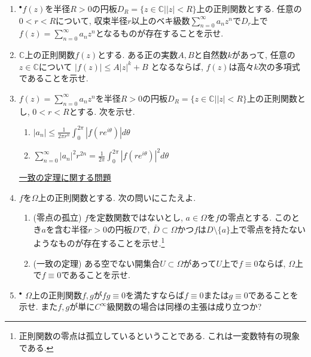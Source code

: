 \documentclass[dvipdfmx,a4paper,11pt]{article}
\newcommand{\N}{\mathbb{N}}
\newcommand{\C}{\mathbb{C}}
\theoremstyle{definition}
\begin{document}
\begin{enumerate}[label=\textbf{問}3.\arabic*]
\item $^{\bullet}$$f(z) $を半径$R>0$の円板$D_{R} = \{ z \in \C | |z|<R\}$上の正則関数とする. 任意の$0 < r < R$について, 収束半径$r$以上のベキ級数$\sum_{n=0}^{\infty} a_n z^n$で$D_{r}$上で$f(z) = \sum_{n=0}^{\infty} a_n z^n$となるものが存在することを示せ. 

  \item $\C$上の正則関数$f(z)$とする. ある正の実数$A,B$と自然数$k$があって, 任意の$z \in \C$について
  $
  |f(z)| \le A|z|^k +B
  $
  となるならば, $f(z)$は高々$k$次の多項式であることを示せ.
  


\item $f(z) = \sum_{n=0}^{\infty} a_n z^n$を半径$R>0$の円板$D_{R} = \{ z \in \C | |z|<R\}$上の正則関数とし, $0< r < R$とする. 次を示せ.
 \begin{enumerate}
\setlength{\parskip}{0cm} 
  \setlength{\itemsep}{0cm} 
  \item $|a_n| \le \frac{1}{2 \pi r^n} \int_{0}^{2 \pi} |f(r e^{i \theta})| d \theta$
  \item  $\sum_{n=0}^{\infty} |a_n|^2 r^{2n} =\frac{1}{2 \pi} \int_{0}^{2 \pi} |f(r e^{i \theta})|^2 d \theta$
  \end{enumerate}
  
\newpage 
  
   \vspace{12pt}
\hspace{-36pt}\underline{一致の定理に関する問題} 
  
    \item $f$を$\Omega$上の正則関数とする.  次の問いにこたえよ.
     \begin{enumerate}
\setlength{\parskip}{0cm} 
  \setlength{\itemsep}{0cm} 
   \item (零点の孤立) $f$を定数関数ではないとし, $a \in \Omega$を$f$の零点とする. 
   このとき$a$を含む半径$r > 0$の円板$D$で, $\bar{D} \subset \Omega$かつ$f$は$D \setminus \{ a\}$上で零点を持たないようなものが存在することを示せ.\footnote{正則関数の零点は孤立しているということである. これは一変数特有の現象である. }
     \item (一致の定理) ある空でない開集合$U \subset \Omega$があって$U$上で$f \equiv 0$ならば, $\Omega$上で$f \equiv0$であることを示せ. 
     
   \end{enumerate}
   \item $^{\bullet}$ $\Omega$上の正則関数$f,g$が$fg \equiv 0$を満たすならば$f \equiv 0$または$g \equiv 0$であることを示せ. また$f,g$が単に$C^{\infty}$級関数の場合は同様の主張は成り立つか?
   
 \end{enumerate}
 
\end{document}
